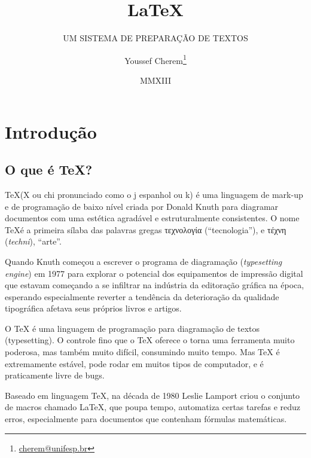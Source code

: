 \documentclass[a4paper,numbers=noenddot,abstract,DIV=calc]{scrbook} %
\title{\fontsize{50}{60}\selectfont \textcolor{YellowOrange}{\rmfamily\LaTeX}}
\subtitle{\textcolor{Dandelion}{UM SISTEMA DE PREPARAÇÃO DE TEXTOS}}
\author{Youssef Cherem\thanks{\href{mailto:cherem@unifesp.br}{cherem@unifesp.br}}}
\date{MMXIII}
\begin{document}
\frenchspacing


\maketitle

\restoregeometry



\tableofcontents

\listoffigures

\listoftables

\chapter{Introdução}

\section{O que é TeX?}
\TeX (X ou chi pronunciado como o j espanhol ou k) é uma linguagem de mark-up e de programação de baixo nível criada por Donald Knuth para diagramar documentos com uma estética agradável e estruturalmente consistentes. O nome \TeX é a primeira sílaba das palavras gregas \textgreek{τεχνολογία} (``tecnologia''), e \textgreek{τέχνη} (\textit{techni}), ``arte''.
	
Quando Knuth começou a escrever o programa de diagramação (\textit{typesetting engine}) em 1977 para explorar o potencial dos equipamentos de impressão digital que estavam começando a se infiltrar na indústria da editoração gráfica na época, esperando especialmente reverter a tendência da deterioração da qualidade tipográfica afetava seus próprios livros e artigos.

O TeX é uma linguagem de programação para diagramação de textos (typesetting). O controle fino que o TeX oferece o torna uma ferramenta muito poderosa, mas também muito difícil, consumindo muito tempo.  Mas TeX é extremamente estável, pode rodar em muitos tipos de computador, e é praticamente livre de bugs.

Baseado em linguagem \TeX, na década de 1980 Leslie Lamport criou o conjunto de macros chamado \LaTeX, que poupa tempo, automatiza certas tarefas e reduz erros, especialmente para documentos que contenham fórmulas matemáticas.
\end{document}
